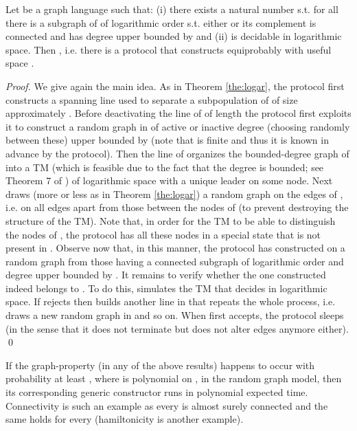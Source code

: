 \documentclass[oribibl, 11pt]{llncs}
\begin{document}
\begin{theorem} [No Waste] \label{the:no-waste}
Let  be a graph language such that:  (i) there exists a natural number  s.t. for all  there is a subgraph  of  of logarithmic order s.t. either  or its complement is connected and has degree upper bounded by  and (ii)  is decidable in logarithmic space. Then , i.e. there is a protocol that constructs  equiprobably with useful space .
\end{theorem}
\begin{proof}
We give again the main idea. As in Theorem \ref{the:logar}, the protocol first constructs a spanning line used to separate a subpopulation  of  of size approximately . Before deactivating the line of  of length  the protocol first exploits it to construct a random graph in  of active or inactive degree (choosing randomly between these) upper bounded by  (note that  is finite and thus it is known in advance by the protocol). Then the line of  organizes the bounded-degree graph of  into a TM  (which is feasible due to the fact that the degree is bounded; see Theorem 7 of \cite{AACFJP05}) of logarithmic space with a unique leader on some node. Next  draws (more or less as in Theorem \ref{the:logar}) a random graph on the edges of , i.e. on all edges apart from those between the nodes of  (to prevent destroying the structure of the TM). Note that, in order for the TM to be able to distinguish the nodes of , the protocol has all these nodes in a special state that is not present in . Observe now that, in this manner, the protocol has constructed on  a random graph from those having a connected subgraph of logarithmic order and degree upper bounded by . It remains to verify whether the one constructed indeed belongs to . To do this,  simulates the TM  that decides  in logarithmic space. If  rejects then  builds another line in  that repeats the whole process, i.e. draws a new random graph in  and so on. When  first accepts, the protocol sleeps (in the sense that it does not terminate but does not alter edges anymore either).  
\qed
\end{proof}

\begin{remark}
If the graph-property  (in any of the above results) happens to occur with probability at least , where  is polynomial on , in the  random graph model, then its corresponding generic constructor runs in polynomial expected time. Connectivity is such an example as every  is almost surely connected and the same holds for every  (hamiltonicity is another example).
\end{remark}
\end{document}
